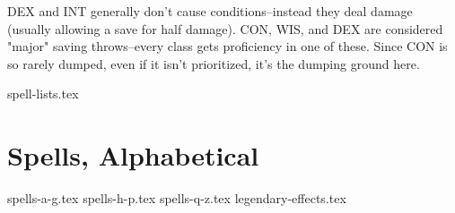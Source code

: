 DEX and INT generally don't cause conditions--instead they deal damage (usually allowing a save for half damage). CON, WIS, and DEX are considered "major" saving throws--every class gets proficiency in one of these. Since CON is so rarely dumped, even if it isn't prioritized, it's the dumping ground here.

{spell-lists.tex}
\section{Spells, Alphabetical}
{spells-a-g.tex}
{spells-h-p.tex}
{spells-q-z.tex}
\clearpage
{legendary-effects.tex}